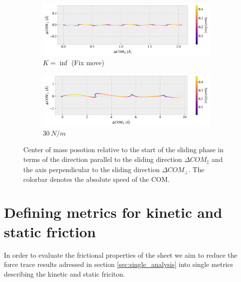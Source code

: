 \begin{figure}[H]
  \centering
  \begin{subfigure}[t]{0.85\textwidth}
    \centering
    \includegraphics[width=\textwidth]{figures/baseline/COM_path_K0.pdf}
    \caption{$K=\inf$ (Fix move)}
    \label{fig:COM_path_K0}
  \end{subfigure}
  \hfill
  \begin{subfigure}[t]{0.85\textwidth}
      \centering
      \includegraphics[width=\textwidth]{figures/baseline/COM_path_K30.pdf}
      \caption{$\SI{30}{N/m}$}
      \label{fig:COM_path_K30}
  \end{subfigure}
  \caption{Center of mass posotion relative to the start of the sliding phase in terms of the direction parallel to the sliding direction $\Delta COM_{\parallel}$ and the axis perpendicular to the sliding direction $\Delta COM_{\perp}$. The colorbar denotes the absolute speed of the COM.}
  \label{fig:COM_path}
\end{figure}


\section{Defining metrics for kinetic and static friction}\label{sec:def_dyn_and_stat}

In order to evaluate the frictional properties of the sheet we aim to reduce the force trace results adressed in section \cref{sec:single_analysis} into single metrics describing the kinetic and static friciton. 

